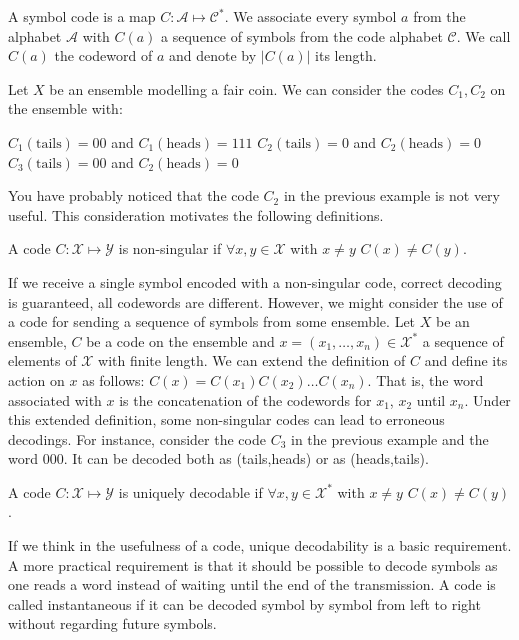 \begin{definition}
A symbol code is a map $C:\mathcal A\mapsto\mathcal C^*$. We associate every symbol $a$ from the alphabet $\mathcal A$ with $C(a)$ a sequence of symbols from the code alphabet $\mathcal C$. We call $C(a)$ the codeword of $a$ and denote by $|C(a)|$ its length. %
\end{definition}
\begin{example}
Let $X$ be an ensemble modelling a fair coin. We can consider the codes $C_1,C_2$ on the ensemble with: 

\noindent $C_1(\text{tails})=00$ and $C_1(\text{heads})=111$
\noindent $C_2(\text{tails})=0$ and $C_2(\text{heads})=0$
\noindent $C_3(\text{tails})=00$ and $C_2(\text{heads})=0$
\end{example}
You have probably noticed that the code $C_2$ in the previous example is not very useful. This consideration motivates the following definitions.
\begin{definition}
A code $C:\mathcal X\mapsto\mathcal Y$ is non-singular if $\forall x,y\in\mathcal X$ with $x\neq y$ $C(x)\neq C(y)$.
\end{definition}
If we receive a single symbol encoded with a non-singular code, correct decoding is guaranteed, all codewords are different. However, we might consider the use of a code for sending a sequence of symbols from some ensemble. Let $X$ be an ensemble, $C$ be a code on the ensemble and $x=(x_1,\ldots,x_n)\in\mathcal X^*$ a sequence of elements of $\mathcal X$ with finite length. We can extend the definition of $C$ and define its action on $x$ as follows: $C(x)=C(x_1)C(x_2)\ldots C(x_n)$. That is, the word associated with $x$ is the concatenation of the codewords for $x_1$, $x_2$ until $x_n$. Under this extended definition, some non-singular codes can lead to erroneous decodings. For instance, consider the code $C_3$ in the previous example and the word $000$. It can be decoded both as (tails,heads) or as (heads,tails).
\begin{definition}
A code $C:\mathcal X\mapsto\mathcal Y$ is uniquely decodable if $\forall x,y\in\mathcal X^*$ with $x\neq y$ $C(x)\neq C(y)$.
\end{definition}
If we think in the usefulness of a code, unique decodability is a basic requirement. A more practical requirement is that it should be possible to decode symbols as one reads a word instead of waiting until the end of the transmission. 
A code is called instantaneous if it can be decoded symbol by symbol from left to right without regarding future symbols. 

